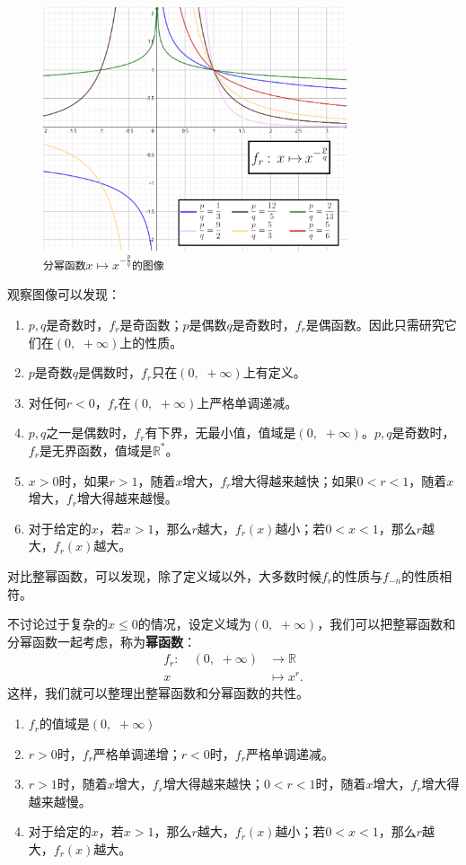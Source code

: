 \documentclass[12pt,UTF8]{ctexbook}
\begin{document}
\begin{figure}[h]
    \vspace{4pt}
    \centering
    \includegraphics[width=0.8\textwidth]{tu/分幂函数3.png}
    \caption*{\texttt{分幂函数}$x\mapsto x^{-\frac{p}{q}}$\texttt{的图像}}
\end{figure}

观察图像可以发现：
\begin{enumerate}
    \item $p, q$是奇数时，$f_r$是奇函数；$p$是偶数$q$是奇数时，$f_r$是偶函数。因此只需研究它们在$(0, \,\,  +\infty)$上的性质。
    \item $p$是奇数$q$是偶数时，$f_r$只在$(0, \,\, +\infty)$上有定义。
    \item 对任何$r < 0$，$f_r$在$(0, \,\, +\infty)$上严格单调递减。
    \item $p, q$之一是偶数时，$f_r$有下界，无最小值，值域是$(0, \,\, +\infty)$。$p, q$是奇数时，$f_r$是无界函数，值域是$\mathbb{R}^*$。
    \item $x>0$时，如果$r>1$，随着$x$增大，$f_r$增大得越来越快；如果$0 < r < 1$，随着$x$增大，$f_r$增大得越来越慢。
    \item 对于给定的$x$，若$x>1$，那么$r$越大，$f_r(x)$越小；若$0 < x<1$，那么$r$越大，$f_r(x)$越大。
\end{enumerate}
对比整幂函数，可以发现，除了定义域以外，大多数时候$f_r$的性质与$f_{-n}$的性质相符。

不讨论过于复杂的$x\leqslant 0$的情况，设定义域为$(0, \,\, +\infty)$，我们可以把整幂函数和分幂函数一起考虑，称为\textbf{幂函数}：
\begin{align*}
    f_r :\quad (0, \,\, +\infty) &\rightarrow \mathbb{R}  \\
    x &\mapsto x^r. 
\end{align*}
这样，我们就可以整理出整幂函数和分幂函数的共性。
\begin{enumerate}
    \item $f_r$的值域是$(0, \,\, +\infty)$
    \item $r > 0$时，$f_r$严格单调递增；$r < 0$时，$f_r$严格单调递减。
    \item $r>1$时，随着$x$增大，$f_r$增大得越来越快；$0 < r < 1$时，随着$x$增大，$f_r$增大得越来越慢。
    \item 对于给定的$x$，若$x>1$，那么$r$越大，$f_r(x)$越小；若$0 < x<1$，那么$r$越大，$f_r(x)$越大。
\end{enumerate}
\end{document}
